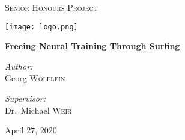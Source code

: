 \begin{titlepage}
	\centering
	
	{\scshape\LARGE Senior Honours Project\par}
	\vspace{0.25cm}
	{\texttt{[image: logo.png]} \par}
	\vspace{0.25cm}
	{\huge\bfseries Freeing Neural Training Through Surfing\par}
	\vspace{0.5cm}

	\vfill

	\noindent
	\begin{minipage}{0.45\textwidth}
		\begin{center} \large
		  \textit{Author:}\\
          Georg \textsc{Wölflein}\\
		\end{center}
    \end{minipage}%
    \begin{minipage}{0.45\textwidth}
		\begin{center} \large
		\textit{Supervisor:} \\
		Dr.~Michael \textsc{Weir}
		\end{center}
	\end{minipage}%

	\vfill

	{April 27, 2020\par}

\end{titlepage}

